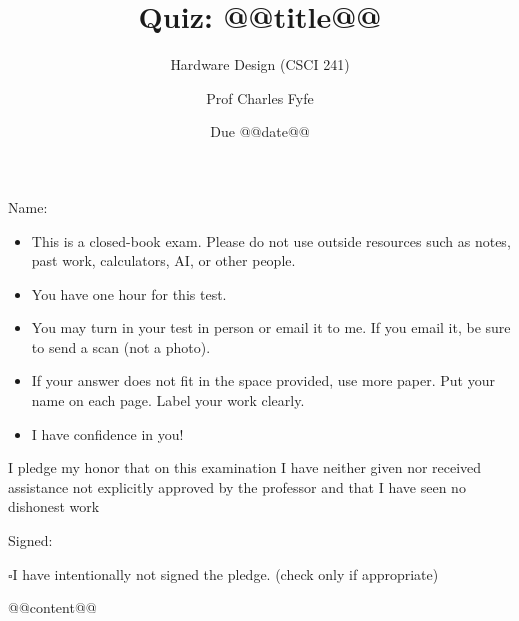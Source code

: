 \documentclass{scrartcl}
\title{Quiz: @@title@@}
\subtitle{Hardware Design (CSCI 241)}
\author{Prof Charles Fyfe}
\date{Due @@date@@}
\newcommand{\testrules}{
\begin{itemize}
  \item This is a closed-book exam. Please do not use outside resources such as notes, past work, calculators, AI, or other people. 
  \item You have one hour for this test.
  \item You may turn in your test in person or email it to me. If you email it, be sure to send a scan (not a photo).
  \item If your answer does not fit in the space provided, use more paper. Put your name on each page. Label your work clearly. 
  \item I have confidence in you!
\end{itemize}
}
\newcommand{\pledge}{
I pledge my honor that on this examination I have neither given nor received assistance not explicitly approved by the professor and that I have seen no dishonest work 

\hfill Signed: \makebox[3in]{\hrulefill}

$\square$\quad I have intentionally not signed the pledge. (check only if appropriate)
}
\begin{document}
\maketitle

\vfill

Name: \makebox[3in]{\hrulefill
\hrulefill}

\vfill

\testrules

\vfill

\pledge

\newpage

@@content@@
\end{document}
